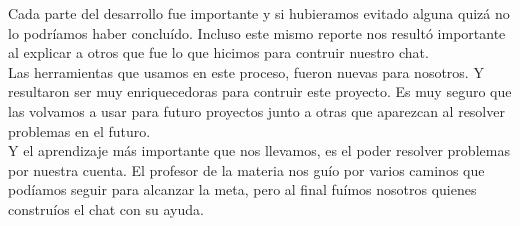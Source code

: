 \documentclass{article}
\begin{document}
Cada parte del desarrollo fue importante y si hubieramos evitado alguna quizá no lo podríamos haber concluído. Incluso este mismo reporte nos resultó importante al explicar a otros que fue lo que hicimos para contruir nuestro chat.\\

Las herramientas que usamos en este proceso, fueron nuevas para nosotros. Y resultaron ser muy enriquecedoras para contruir este proyecto. Es muy seguro que las volvamos a usar para futuro proyectos junto a otras que aparezcan al resolver problemas en el futuro.\\

Y el aprendizaje más importante que nos llevamos, es el poder resolver problemas por nuestra cuenta. El profesor de la materia nos guío por varios caminos que podíamos seguir para alcanzar la meta, pero al final fuímos nosotros quienes construíos el chat con su ayuda. \\

\nocite{*}


\end{document}
